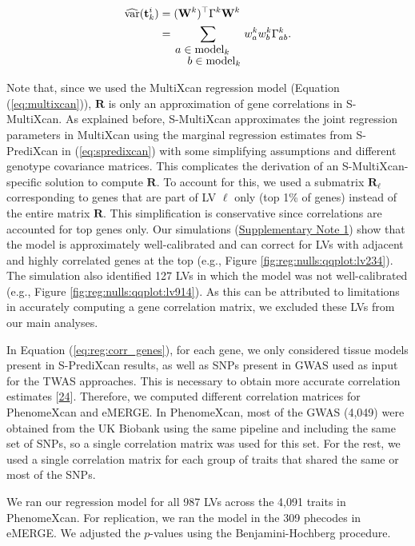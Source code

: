 \documentclass[
]{article}
\begin{document}
\begin{equation}
\begin{split}
\widehat{\mathrm{var}}(\mathbf{t}_k^i) & = (\mathbf{W}^k)^\top \Gamma^k \mathbf{W}^k \\
        & = \sum_{\splitfrac{a \in \mathrm{model}_k}{b \in \mathrm{model}_k}} w_a^k w_b^k \Gamma_{ab}^k.
\end{split}
\label{eq:reg:var_gene}\end{equation}

Note that, since we used the MultiXcan regression model (Equation (\ref{eq:multixcan})), \(\mathbf{R}\) is only an approximation of gene correlations in S-MultiXcan.
As explained before, S-MultiXcan approximates the joint regression parameters in MultiXcan using the marginal regression estimates from S-PrediXcan in (\ref{eq:spredixcan}) with some simplifying assumptions and different genotype covariance matrices.
This complicates the derivation of an S-MultiXcan-specific solution to compute \(\mathbf{R}\).
To account for this, we used a submatrix \(\mathbf{R}_{\ell}\) corresponding to genes that are part of LV \(\ell\) only (top 1\% of genes) instead of the entire matrix \(\mathbf{R}\).
This simplification is conservative since correlations are accounted for top genes only.
Our simulations (\protect\hyperlink{sm:reg:null_sim}{Supplementary Note 1}) show that the model is approximately well-calibrated and can correct for LVs with adjacent and highly correlated genes at the top (e.g., Figure \ref{fig:reg:nulls:qqplot:lv234}).
The simulation also identified 127 LVs in which the model was not well-calibrated (e.g., Figure \ref{fig:reg:nulls:qqplot:lv914}).
As this can be attributed to limitations in accurately computing a gene correlation matrix, we excluded these LVs from our main analyses.

In Equation (\ref{eq:reg:corr_genes}), for each gene, we only considered tissue models present in S-PrediXcan results, as well as SNPs present in GWAS used as input for the TWAS approaches.
This is necessary to obtain more accurate correlation estimates {[}\protect\hyperlink{ref-1FFzCXo1s}{24}{]}.
Therefore, we computed different correlation matrices for PhenomeXcan and eMERGE.
In PhenomeXcan, most of the GWAS (4,049) were obtained from the UK Biobank using the same pipeline and including the same set of SNPs, so a single correlation matrix was used for this set.
For the rest, we used a single correlation matrix for each group of traits that shared the same or most of the SNPs.

We ran our regression model for all 987 LVs across the 4,091 traits in PhenomeXcan.
For replication, we ran the model in the 309 phecodes in eMERGE.
We adjusted the \(p\)-values using the Benjamini-Hochberg procedure.
\end{document}
